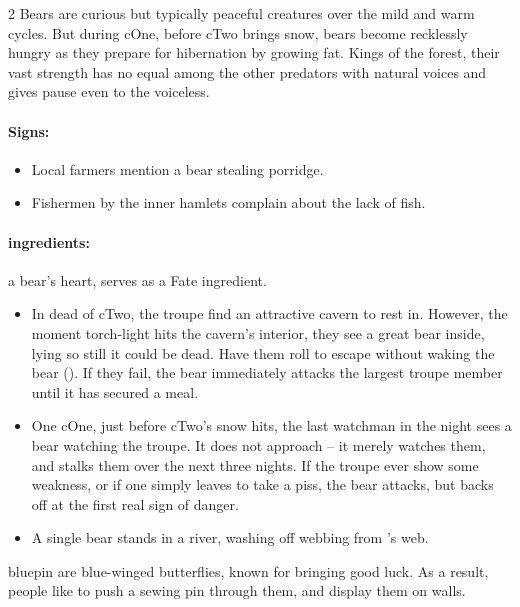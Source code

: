 \begin{multicols}{2}
\showEnc
Bears are curious but typically peaceful creatures over the mild and warm \glspl{cycle}.
But during \gls{cOne}, before \gls{cTwo} brings snow, bears become recklessly hungry as they prepare for hibernation by growing fat.
Kings of the forest, their vast strength has no equal among the other predators with natural voices and gives pause even to the voiceless.

\paragraph{Signs:}

\begin{itemize}
  \item
  Local farmers mention a bear stealing porridge.
  \item
  Fishermen by the inner hamlets complain about the lack of fish.
\end{itemize}

\paragraph{\Glspl{ingredient}:}
a bear's heart, serves as a Fate \gls{ingredient}.

\begin{itemize}
  \item
  In dead of \gls{cTwo}, the troupe find an attractive cavern to rest in.
  However, the moment torch-light hits the cavern's interior, they see a great bear inside, lying so still it could be dead.
  Have them roll  to escape without waking the bear (\tn[8]).
  If they fail, the bear immediately attacks the largest troupe member until it has secured a meal.
  \item
  One \gls{cOne}, just before \gls{cTwo}'s snow hits, the last watchman in the night sees a bear watching the troupe.
  It does not approach -- it merely watches them, and stalks them over the next three nights.
  If the troupe ever show some weakness, or if one simply leaves to take a piss, the bear attacks, but backs off at the first real sign of danger.
  \item
  A single bear stands in a river, washing off webbing from 's web.
\end{itemize}

  {bluepin}%
are blue-winged butterflies, known for bringing good luck.
As a result, people like to push a sewing pin through them, and display them on walls.


\end{multicols}
